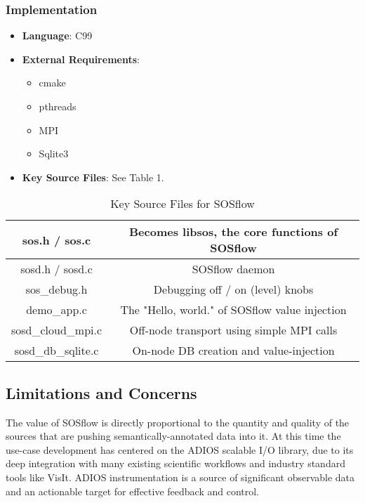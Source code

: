 \subsubsection{Implementation}
\begin{itemize}
  \item \textbf{Language}: C99
   \item \textbf{External Requirements}:
   \begin{itemize}
    \item cmake
    \item pthreads
    \item MPI
    \item Sqlite3
    \end{itemize}
  \item \textbf{Key Source Files}: See Table 1.
\end{itemize}

\begin{table}[!t]
\renewcommand{\arraystretch}{1.3}
\caption{Key Source Files for SOSflow}
\label{table_example}
\centering
\begin{tabular}{|c|c|}
\hline %
sos.h / sos.c & Becomes libsos, the core functions of SOSflow\\
\hline %
sosd.h / sosd.c & SOSflow daemon\\
\hline %
sos\_debug.h & Debugging off / on (level) knobs\\
\hline %
demo\_app.c & The "Hello, world." of SOSflow value injection\\
\hline %
sosd\_cloud\_mpi.c & Off-node transport using simple MPI calls\\
\hline %
sosd\_db\_sqlite.c & On-node DB creation and value-injection\\
\hline %
\end{tabular}
\end{table}


\subsection{Limitations and Concerns}
The value of SOSflow is directly proportional to the quantity and
quality of the sources that are pushing semantically-annotated data
into it. At this time the use-case development has centered on the
ADIOS scalable I/O library, due to its deep integration with many
existing scientific workflows and industry standard tools like
VisIt. ADIOS instrumentation is a source of significant observable
data and an actionable target for effective feedback and control.

